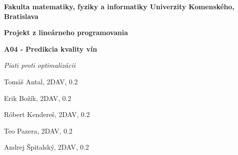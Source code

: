 \documentclass[12pt,oneside,a4paper,slovak]{article}
\begin{document}
	
		\parindent 0cm 
	\parskip 0.2cm
	\begin{titlepage}
		\large
		
		\begin{center}
			\textbf{Fakulta matematiky, fyziky a informatiky Univerzity Komenského, Bratislava}
			
			\vspace{7cm}
			
			\LARGE\textbf{Projekt z lineárneho programovania}
			
			\LARGE\textbf{A04 - Predikcia kvality vín}
			
			\bigskip
		\end{center}
			
		\vfill  %
		
		\hfill  %
		\begin{minipage}{0.5\textwidth}  %
			\raggedleft
			
			\textit{Piati proti optimalizácii}
	
			Tomáš Antal, 2DAV, 0.2
			
			Erik Božík, 2DAV, 0.2
			
			Róbert Kendereš, 2DAV, 0.2
			
			Teo Pazera, 2DAV, 0.2
			
			Andrej Špitalský, 2DAV, 0.2
		\end{minipage}
			
	\end{titlepage}
	
	
	\newpage
	
	\newpage
	
	\newpage
	
	\newpage
	
	\newpage
	
\end{document}
